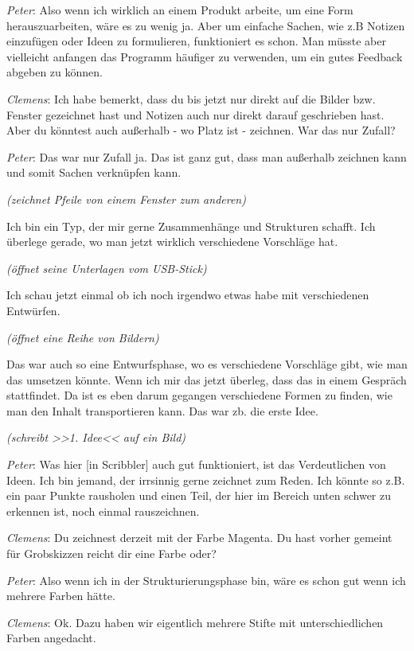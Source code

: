 \medskip \emph{Peter}: Also wenn ich wirklich an einem Produkt arbeite, um eine Form herauszuarbeiten, wäre es zu wenig ja. Aber um einfache Sachen, wie z.B Notizen einzufügen oder Ideen zu formulieren, funktioniert es schon. Man müsste aber vielleicht anfangen das Programm häufiger zu verwenden, um ein gutes Feedback abgeben zu können.

\medskip \emph{Clemens}: Ich habe bemerkt, dass du bis jetzt nur direkt auf die Bilder bzw. Fenster gezeichnet hast und Notizen auch nur direkt darauf geschrieben hast. Aber du könntest auch außerhalb - wo Platz ist - zeichnen. War das nur Zufall?

\medskip \emph{Peter}: Das war nur Zufall ja. Das ist ganz gut, dass man außerhalb zeichnen kann und somit Sachen verknüpfen kann. 

\smallskip \emph{(zeichnet Pfeile von einem Fenster zum anderen)}

\smallskip Ich bin ein Typ, der mir gerne Zusammenhänge und Strukturen schafft.
Ich überlege gerade, wo man jetzt wirklich verschiedene Vorschläge hat.

\smallskip \emph{(öffnet seine Unterlagen vom \ac{USB}-Stick)} 

\smallskip Ich schau jetzt einmal ob ich noch irgendwo etwas habe mit verschiedenen Entwürfen. 

\smallskip \emph{(öffnet eine Reihe von Bildern)}

\smallskip Das war auch so eine Entwurfsphase, wo es verschiedene Vorschläge gibt, wie man das umsetzen könnte. Wenn ich mir das jetzt überleg, dass das in einem Gespräch stattfindet. Da ist es eben darum gegangen verschiedene Formen zu finden, wie man den Inhalt transportieren kann. Das war zb. die erste Idee.

\smallskip \emph{(schreibt >>1. Idee<< auf ein Bild)}

\medskip \emph{Peter}: Was hier [in Scribbler] auch gut funktioniert, ist das Verdeutlichen von Ideen. Ich bin jemand, der irrsinnig gerne zeichnet zum Reden. Ich könnte so z.B. ein paar Punkte rausholen und einen Teil, der hier im Bereich unten schwer zu erkennen ist, noch einmal rauszeichnen.

\medskip \emph{Clemens}: Du zeichnest derzeit mit der Farbe Magenta. Du hast vorher gemeint für Grobskizzen reicht dir eine Farbe oder?

\medskip \emph{Peter}: Also wenn ich in der Strukturierungsphase bin, wäre es schon gut wenn ich mehrere Farben hätte.

\medskip \emph{Clemens}: Ok. Dazu haben wir eigentlich mehrere Stifte mit unterschiedlichen Farben angedacht.

